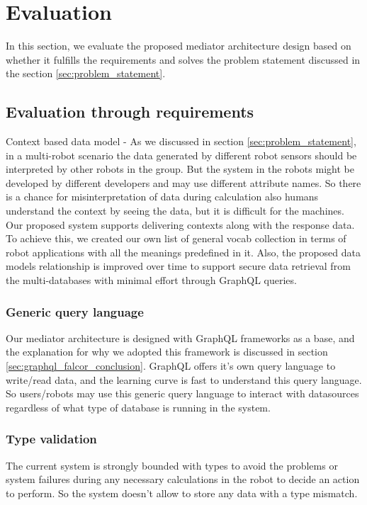 

	\let\cleardoublepage\clearpage
\chapter{Evaluation} \label{sec:evaluation}
In this section, we evaluate the proposed mediator architecture design based on whether it fulfills the requirements and solves the problem statement discussed in the section \ref{sec:problem_statement}. 

\section{Evaluation through requirements}
Context based data model - As we discussed in section \ref{sec:problem_statement}, in a multi-robot scenario the data generated by different robot sensors should be interpreted by other robots in the group. But the system in the robots might be developed by different developers and may use different attribute names. So there is a chance for misinterpretation of data during calculation also humans understand the context by seeing the data, but it is difficult for the machines. Our proposed system supports delivering contexts along with the response data. To achieve this, we created our own list of general vocab collection in terms of robot applications with all the meanings predefined in it. Also, the proposed data models relationship is improved over time to support secure data retrieval from the multi-databases with minimal effort through GraphQL queries.

\subsection{Generic query language}
Our mediator architecture is designed with GraphQL frameworks as a base, and the explanation for why we adopted this framework is discussed in section \ref{sec:graphql_falcor_conclusion}. GraphQL offers it's own query language to write/read data, and the learning curve is fast to understand this query language. So users/robots may use this generic query language to interact with datasources regardless of what type of database is running in the system.

\subsection{Type validation}
The current system is strongly bounded with types to avoid the problems or system failures during any necessary calculations in the robot to decide an action to perform. So the system doesn't allow to store any data with a type mismatch. 


